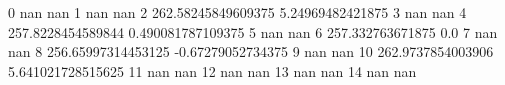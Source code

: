 0 nan nan
1 nan nan
2 262.58245849609375 5.24969482421875
3 nan nan
4 257.8228454589844 0.490081787109375
5 nan nan
6 257.332763671875 0.0
7 nan nan
8 256.65997314453125 -0.67279052734375
9 nan nan
10 262.9737854003906 5.641021728515625
11 nan nan
12 nan nan
13 nan nan
14 nan nan
